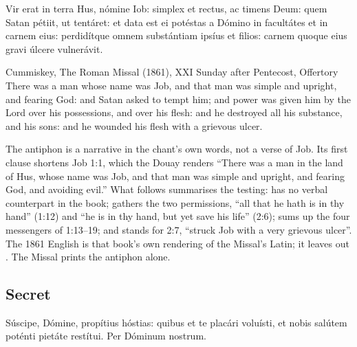 
\begin{latinproper}
Vir erat in terra Hus, nómine Iob: simplex et rectus, ac timens Deum: quem
Satan pétiit, ut tentáret: et data est ei potéstas a Dómino in facultátes et in
carnem eius: perdidítque omnem substántiam ipsíus et filios: carnem quoque eius
gravi úlcere vulnerávit.
\end{latinproper}

\begin{englishwitness}{Cummiskey, The Roman Missal (1861), XXI Sunday after Pentecost, Offertory}
There was a man whose name was Job, and that man was simple and upright, and
fearing God: and Satan asked to tempt him; and power was given him by the Lord
over his possessions, and over his flesh: and he destroyed all his substance,
and his sons: and he wounded his flesh with a grievous ulcer.
\end{englishwitness}

\noindent The antiphon is a narrative in the chant's own words, not a verse of
Job. Its first clause shortens Job 1:1, which the Douay renders ``There was a man
in the land of Hus, whose name was Job, and that man was simple and upright, and
fearing God, and avoiding evil.'' What follows summarises the testing:
 has no verbal counterpart in the book;
 gathers the
two permissions, ``all that he hath is in thy hand'' (1:12) and ``he is in thy
hand, but yet save his life'' (2:6);  sums up the four messengers of 1:13--19; and  stands for 2:7, ``struck Job with a very grievous
ulcer''. The 1861 English is that book's own rendering of the Missal's Latin;
it leaves out . The Missal prints the antiphon alone.

\subsection{Secret}
\label{proper-secret}


\begin{latinproper}
Súscipe, Dómine, propítius hóstias: quibus et te placári voluísti, et nobis
salútem poténti pietáte restítui. Per Dóminum nostrum.
\end{latinproper}

